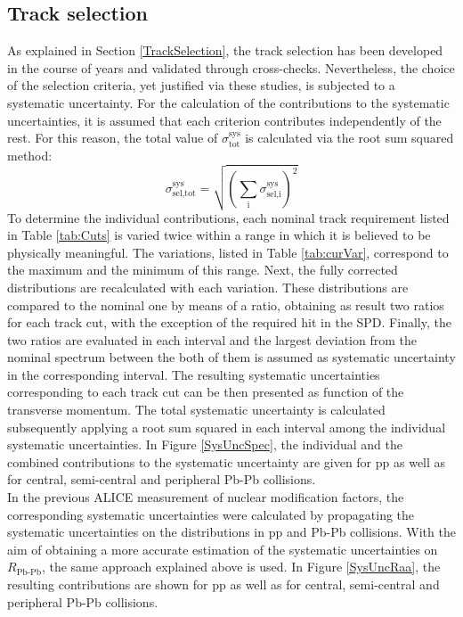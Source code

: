 \documentclass[12pt,a4paper]{report}
\begin{document}
\subsection{Track selection} 
\label{systracksel}
As explained in Section \ref{TrackSelection}, the track selection has been developed in the course of years and validated through cross-checks. Nevertheless, the choice of the selection criteria, yet justified via these studies, is subjected to a systematic uncertainty. For the calculation of the contributions to the systematic uncertainties, it is assumed that each criterion contributes independently of the rest. For this reason, the total value of $\sigma^\text{sys}_\text{tot}$ is calculated via the root sum squared method:
\begin{equation}
\sigma^\text{sys}_\text{sel,tot} = \sqrt{\left(\sum_{\text{i}}\sigma^\text{sys}_\text{sel,i} \right)^2}
\end{equation} 
To determine the individual contributions, each nominal track requirement listed in Table \ref{tab:Cuts} is varied twice within a range in which it is believed to be physically meaningful. The variations, listed in Table \ref{tab:curVar}, correspond to the maximum and the minimum of this range. Next, the fully corrected \pt distributions are recalculated with each variation. These \pt distributions are compared to the nominal one by means of a ratio, obtaining as result two ratios for each track cut, with the exception of the required hit in the SPD. Finally, the two ratios are evaluated in each \pt interval and the largest deviation from the nominal \pt spectrum between the both of them is assumed as systematic uncertainty in the corresponding \pt interval. The resulting systematic uncertainties corresponding to each track cut can be then presented as function of the transverse momentum. The total systematic uncertainty is calculated subsequently applying a root sum squared in each \pt interval among the individual systematic uncertainties. In Figure \ref{SysUncSpec}, the individual and the combined contributions to the systematic uncertainty are given for pp as well as for central, semi-central and peripheral Pb-Pb collisions. \\
In the previous ALICE measurement of nuclear modification factors, the corresponding systematic uncertainties were calculated by propagating the systematic uncertainties on the \pt distributions in pp and Pb-Pb collisions. With the aim of obtaining a more accurate estimation of the systematic uncertainties on $R_\text{Pb-Pb}$, the same approach explained above is used. In Figure \ref{SysUncRaa}, the resulting contributions are shown for pp as well as for central, semi-central and peripheral Pb-Pb collisions.
\end{document}
